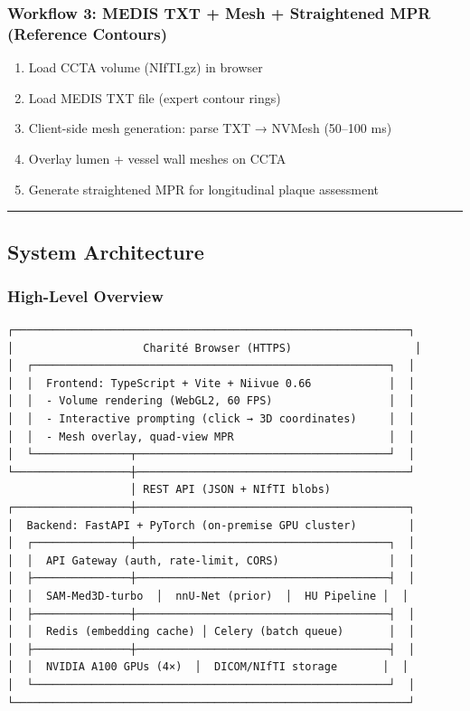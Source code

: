 \documentclass[
  11pt,
]{article}
\providecommand{\tightlist}{%
  \setlength{\itemsep}{0pt}\setlength{\parskip}{0pt}}
\begin{document}
\subsubsection{Workflow 3: MEDIS TXT + Mesh + Straightened MPR
(Reference
Contours)}\label{workflow-3-medis-txt-mesh-straightened-mpr-reference-contours}

\begin{enumerate}
\def\labelenumi{\arabic{enumi}.}
\tightlist
\item
  Load CCTA volume (NIfTI.gz) in browser
\item
  Load MEDIS TXT file (expert contour rings)
\item
  Client-side mesh generation: parse TXT → NVMesh (50--100 ms)
\item
  Overlay lumen + vessel wall meshes on CCTA
\item
  Generate straightened MPR for longitudinal plaque assessment
\end{enumerate}

\begin{center}\rule{0.5\linewidth}{0.5pt}\end{center}

\subsection{System Architecture}\label{system-architecture}

\subsubsection{High-Level Overview}\label{high-level-overview}

\begin{verbatim}
┌─────────────────────────────────────────────────────────────┐
│                    Charité Browser (HTTPS)                   │
│  ┌───────────────────────────────────────────────────────┐  │
│  │  Frontend: TypeScript + Vite + Niivue 0.66            │  │
│  │  - Volume rendering (WebGL2, 60 FPS)                  │  │
│  │  - Interactive prompting (click → 3D coordinates)     │  │
│  │  - Mesh overlay, quad-view MPR                        │  │
│  └───────────────┬───────────────────────────────────────┘  │
└──────────────────┼──────────────────────────────────────────┘
                   │ REST API (JSON + NIfTI blobs)
┌──────────────────┼──────────────────────────────────────────┐
│  Backend: FastAPI + PyTorch (on-premise GPU cluster)        │
│  ┌───────────────┼───────────────────────────────────────┐  │
│  │  API Gateway (auth, rate-limit, CORS)                 │  │
│  ├───────────────┼───────────────────────────────────────┤  │
│  │  SAM-Med3D-turbo  │  nnU-Net (prior)  │  HU Pipeline │  │
│  ├───────────────┼───────────────────────────────────────┤  │
│  │  Redis (embedding cache) │ Celery (batch queue)       │  │
│  ├───────────────┼───────────────────────────────────────┤  │
│  │  NVIDIA A100 GPUs (4×)  │  DICOM/NIfTI storage       │  │
│  └───────────────────────────────────────────────────────┘  │
└─────────────────────────────────────────────────────────────┘
\end{verbatim}
\end{document}
